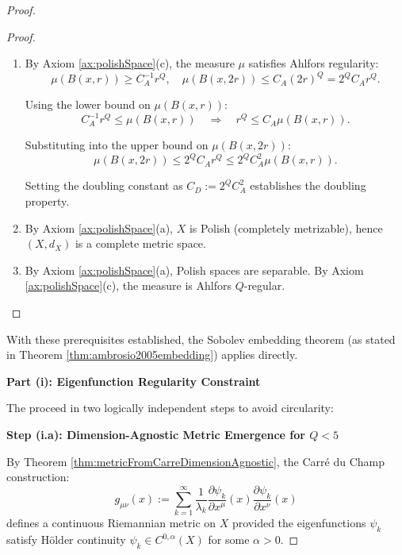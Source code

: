 \begin{lemma}
\begin{proof}
\begin{lemma}
\begin{proof}
\begin{enumerate}
\item[\textbf{(P1) Doubling Property:}] By Axiom \ref{ax:polishSpace}(c), the measure $\mu$ satisfies Ahlfors regularity:
\begin{equation}
\mu(B(x,r)) \geq C_A^{-1} r^Q, \quad \mu(B(x, 2r)) \leq C_A (2r)^Q = 2^Q C_A r^Q.
\end{equation}

Using the lower bound on $\mu(B(x,r))$:
\begin{equation}
C_A^{-1} r^Q \leq \mu(B(x,r)) \quad \Rightarrow \quad r^Q \leq C_A \mu(B(x,r)).
\end{equation}

Substituting into the upper bound on $\mu(B(x,2r))$:
\begin{equation}
\mu(B(x,2r)) \leq 2^Q C_A r^Q \leq 2^Q C_A^2 \mu(B(x,r)).
\end{equation}

Setting the doubling constant as $C_D := 2^Q C_A^2$ establishes the doubling property.

\item[\textbf{(P2) Completeness:}] By Axiom \ref{ax:polishSpace}(a), $X$ is Polish (completely metrizable), hence $(X, d_X)$ is a complete metric space.

\item[\textbf{(P3) Separability and Regularity:}] By Axiom \ref{ax:polishSpace}(a), Polish spaces are separable. By Axiom \ref{ax:polishSpace}(c), the measure is Ahlfors $Q$-regular.
\end{enumerate}
\end{proof}

\end{lemma}

With these prerequisites established, the Sobolev embedding theorem (as stated in Theorem \ref{thm:ambrosio2005embedding}) applies directly.

\textbf{Part (i): Eigenfunction Regularity Constraint}

The proceed in two logically independent steps to avoid circularity:

\textbf{Step (i.a): Dimension-Agnostic Metric Emergence for $Q < 5$}

By Theorem \ref{thm:metricFromCarreDimensionAgnostic}, the Carré du Champ construction:
\begin{equation}
g_{\mu\nu}(x) := \sum_{k=1}^{\infty} \frac{1}{\lambda_k} \frac{\partial \psi_k}{\partial x^\mu}(x) \frac{\partial \psi_k}{\partial x^\nu}(x)
\end{equation}
defines a continuous Riemannian metric on $X$ provided the eigenfunctions $\psi_k$ satisfy Hölder continuity $\psi_k \in C^{0,\alpha}(X)$ for some $\alpha > 0$.


\end{proof}
\end{lemma}
